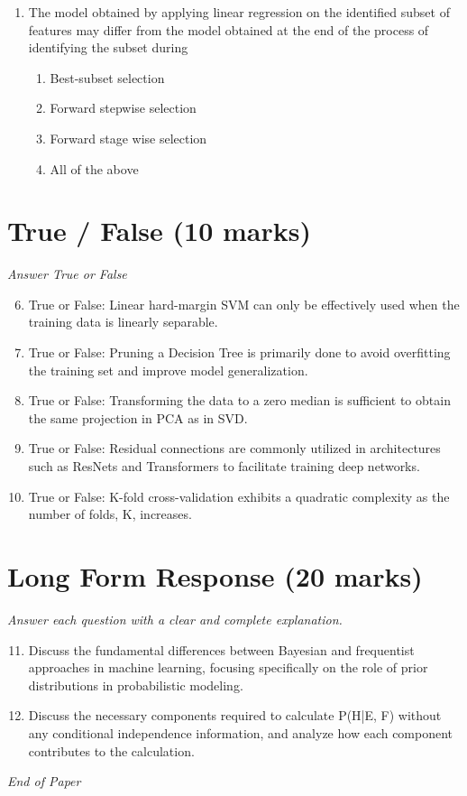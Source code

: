 \documentclass[12pt]{article}
\begin{document}
\begin{enumerate}[label=\arabic*.]
\begin{enumerate}[label=(\alph*)]
    \item None of the above
\end{enumerate}
\item The model obtained by applying linear regression on the identified subset of features may differ from the model obtained at the end of the process of identifying the subset during
\begin{enumerate}[label=(\alph*)]
    \item Best-subset selection
    \item Forward stepwise selection
    \item Forward stage wise selection
    \item All of the above
\end{enumerate}
\end{enumerate}

\section*{True / False (10 marks)}
\textit{Answer True or False}
\begin{enumerate}[label=\arabic*.]
\setcounter{enumi}{5}
\item True or False: Linear hard-margin SVM can only be effectively used when the training data is linearly separable.
\item True or False: Pruning a Decision Tree is primarily done to avoid overfitting the training set and improve model generalization.
\item True or False: Transforming the data to a zero median is sufficient to obtain the same projection in PCA as in SVD.
\item True or False: Residual connections are commonly utilized in architectures such as ResNets and Transformers to facilitate training deep networks.
\item True or False: K-fold cross-validation exhibits a quadratic complexity as the number of folds, K, increases.
\end{enumerate}

\section*{Long Form Response (20 marks)}
\textit{Answer each question with a clear and complete explanation.}
\begin{enumerate}[label=\arabic*.]
\setcounter{enumi}{10}
\item Discuss the fundamental differences between Bayesian and frequentist approaches in machine learning, focusing specifically on the role of prior distributions in probabilistic modeling.
\item Discuss the necessary components required to calculate P(H|E, F) without any conditional independence information, and analyze how each component contributes to the calculation.
\end{enumerate}

\vfill
\noindent\textit{End of Paper}
\end{document}
